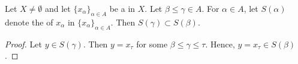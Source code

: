 \begin{prop}
    \label{def:NetSection}
    Let $X \neq \emptyset$ 
    and let $\{x_\alpha\}_{\alpha \in A}$ 
    be a \Net in $X$. 
    Let $\beta \leq \gamma \in A$. 
    For $\alpha \in A$, let 
    $S(\alpha)$ denote the \NetSection
    of $x_\alpha$ in $\{x_\alpha\}_{\alpha \in A}$. 
    Then $S(\gamma) \subset S(\beta)$. 
    \begin{proof}
        Let $y \in S(\gamma)$.
        Then $y=x_\tau$ for some $\beta \leq \gamma \leq \tau$. 
        Hence, $y=x_\tau \in S(\beta)$. 

    \end{proof}
\end{prop}
